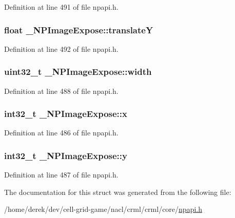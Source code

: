 Definition at line 491 of file npapi.h.

\hypertarget{struct___n_p_image_expose_ab7a799a5a3cf7efeaca5eb0fc1d5265d}{
\subsubsection[{translateY}]{\setlength{\rightskip}{0pt plus 5cm}float {\bf \_\-NPImageExpose::translateY}}}
\label{struct___n_p_image_expose_ab7a799a5a3cf7efeaca5eb0fc1d5265d}


Definition at line 492 of file npapi.h.

\hypertarget{struct___n_p_image_expose_ac250a8831a9bc7b97ea911baa38a17b5}{
\subsubsection[{width}]{\setlength{\rightskip}{0pt plus 5cm}uint32\_\-t {\bf \_\-NPImageExpose::width}}}
\label{struct___n_p_image_expose_ac250a8831a9bc7b97ea911baa38a17b5}


Definition at line 488 of file npapi.h.

\hypertarget{struct___n_p_image_expose_a636eff0e6eb37cc897f3968e2bbcd645}{
\subsubsection[{x}]{\setlength{\rightskip}{0pt plus 5cm}int32\_\-t {\bf \_\-NPImageExpose::x}}}
\label{struct___n_p_image_expose_a636eff0e6eb37cc897f3968e2bbcd645}


Definition at line 486 of file npapi.h.

\hypertarget{struct___n_p_image_expose_a25c47ac7da24f57ef6bba671e1b8d33b}{
\subsubsection[{y}]{\setlength{\rightskip}{0pt plus 5cm}int32\_\-t {\bf \_\-NPImageExpose::y}}}
\label{struct___n_p_image_expose_a25c47ac7da24f57ef6bba671e1b8d33b}


Definition at line 487 of file npapi.h.



The documentation for this struct was generated from the following file:\begin{DoxyCompactItemize}
\item 
/home/derek/dev/cell-\/grid-\/game/nacl/crml/crml/core/\hyperlink{npapi_8h}{npapi.h}\end{DoxyCompactItemize}
